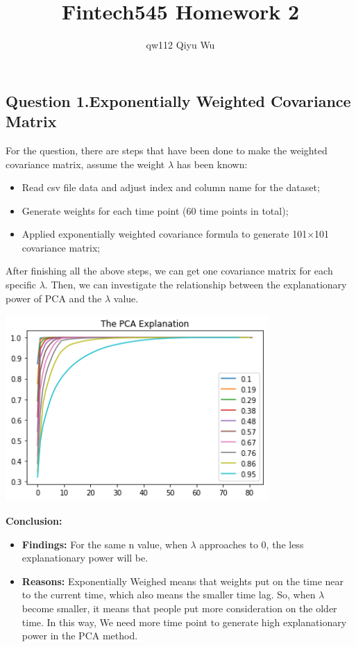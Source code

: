 \documentclass[a4paper,12pt]{article}
\title{Fintech545 Homework 2}
\author{qw112 Qiyu Wu}
\date{}
\begin{document}
\maketitle  
\subsection*{Question 1.Exponentially Weighted Covariance Matrix}
For the question, there are steps that have been done to make the weighted covariance matrix, assume the weight $\lambda$ has been known:
\begin{itemize}
    \item Read csv file data and adjust index and column name for the dataset;
    \item Generate weights for each time point (60 time points in total);
    \item Applied exponentially weighted covariance formula to generate 101$\times$101 covariance matrix;
\end{itemize}
After finishing all the above steps, we can get one covariance matrix for each specific $\lambda$. Then, we can investigate the relationship between the explanationary power of PCA and the $\lambda$ value. 
\begin{center}
    \includegraphics[width=10cm]{Q1.png}
\end{center}
\textbf{Conclusion:}
\begin{itemize}
    \item \textbf{Findings:} For the same n value, when $\lambda$ approaches to 0, the less explanationary power will be.
    \item \textbf{Reasons:} Exponentially Weighed means that weights put on the time near to the current time, which also means the smaller time lag. So, when $\lambda$ become smaller, it means that people put more consideration on the older time. In this way, We need more time point to generate high explanationary power in the PCA method.
\end{itemize}
\end{document}

